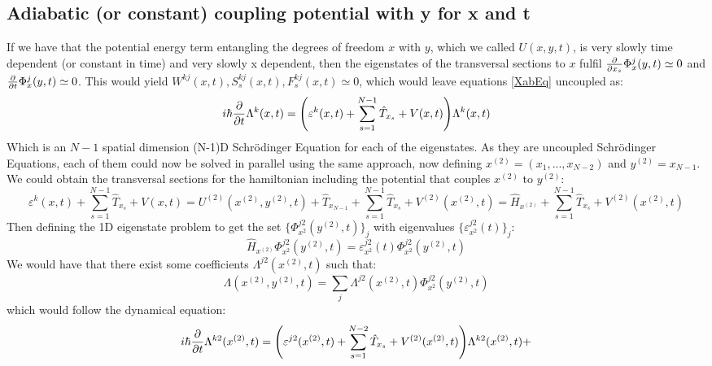 \documentclass[11pt, a4paper]{article} %
\begin{document}
\subsection{Adiabatic (or constant) coupling potential with y for x and t}
If we have that the potential energy term entangling the degrees of freedom $x$ with $y$, which we called $U(x,y,t)$, is very slowly time dependent (or constant in time) and very slowly x dependent, then the eigenstates of the transversal sections to $x$ fulfil $\pdv{}{x_s}\Phi^j_x(y,t)\simeq 0$ and $\pdv{}{t}\Phi^j_x(y,t)\simeq 0$. This would yield $W^{kj}(x,t),S^{kj}_s(x,t),F^{kj}_s(x,t)\simeq 0$, which would leave equations \eqref{XabEq} uncoupled as:
\begin{equation}\label{startInception}
i\hbar \pdv{}{t}\Lambda^k(x,t) = \qty( \varepsilon^k(x,t) + \sum_{s=1}^{N-1}\hat{T}_{x_s} +V(x,t))\Lambda^k(x,t)
\end{equation}
Which is an $N-1$ spatial dimension (N-1)D Schrödinger Equation for each of the eigenstates. As they are uncoupled Schrödinger Equations, each of them could now be solved in parallel using the same approach, now defining $x^{(2)}=(x_1,...,x_{N-2})$ and $y^{(2)}=x_{N-1}$. We could obtain the transversal sections for the hamiltonian including the potential that couples $x^{(2)}$ to $y^{(2)}$:
\begin{equation}
\varepsilon^k(x,t) + \sum_{s=1}^{N-1}\hat{T}_{x_s} +V(x,t)= U^{(2)}(x^{(2)}, y^{(2)},t)+ \hat{T}_{x_{N-1}} + \sum_{s=1}^{N-1}\hat{T}_{x_s}+V^{(2)}(x^{(2)},t)=\hat{H}_{x^{(2)}}+ \sum_{s=1}^{N-1}\hat{T}_{x_s}+V^{(2)}(x^{(2)},t)
\end{equation}
Then defining the 1D eigenstate problem to get the set $\{\Phi^{j2}_{x^{2}}(y^{(2)},t)\}_j$ with eigenvalues $\{\varepsilon^{j2}_{x^{2}} (t)\}_j$:
\begin{equation}
\hat{H}_{x^{(2)}}\Phi^{j2}_{x^{2}}(y^{(2)},t) = \varepsilon^{j2}_{x^{2}} (t) \Phi^{j2}_{x^{2}}(y^{(2)},t)
\end{equation}
We would have that there exist some coefficients $\Lambda^{j2}(x^{(2)},t)$ such that:
\begin{equation}
\Lambda(x^{(2)},y^{(2)},t)=\sum_j \Lambda^{j2}(x^{(2)},t) \Phi^{j2}_{x^{2}}(y^{(2)},t)
\end{equation}
which would follow the dynamical equation:
\begin{equation}
i\hbar \pdv{}{t}\Lambda^{k2}(x^{(2)},t)  = \qty( \varepsilon^{j2}(x^{(2)},t) + \sum_{s=1}^{N-2}\hat{T}_{x_s} +V^{(2)}(x^{(2)},t))\Lambda^{k2}(x^{(2)},t)+
\end{equation}
\end{document}
